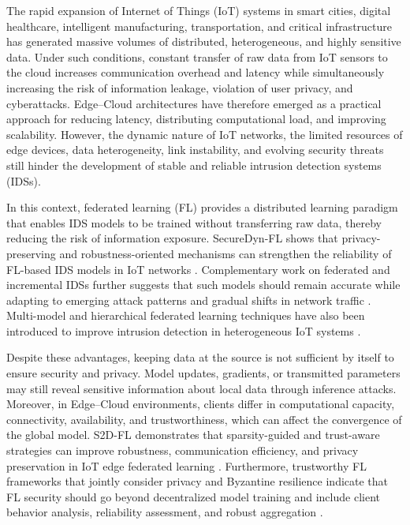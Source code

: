 \documentclass[5p,times,numafflabel]{elsarticle}
\begin{document}
	The rapid expansion of Internet of Things (IoT) systems in smart
	cities, digital healthcare, intelligent manufacturing, transportation,
	and critical infrastructure has generated massive volumes of
	distributed, heterogeneous, and highly sensitive data. Under such
	conditions, constant transfer of raw data from IoT sensors to the cloud
	increases communication overhead and latency while simultaneously
	increasing the risk of information leakage, violation of user privacy,
	and cyberattacks. Edge--Cloud architectures have therefore emerged as
	a practical approach for reducing latency, distributing computational
	load, and improving scalability. However, the dynamic nature of IoT
	networks, the limited resources of edge devices, data heterogeneity,
	link instability, and evolving security threats still hinder the
	development of stable and reliable intrusion detection systems (IDSs).
	
	In this context, federated learning (FL) provides a distributed
	learning paradigm that enables IDS models to be trained without
	transferring raw data, thereby reducing the risk of information
	exposure. SecureDyn-FL shows that privacy-preserving and
	robustness-oriented mechanisms can strengthen the reliability of
	FL-based IDS models in IoT networks
	\cite{soomro2026securedyn}. Complementary work on federated and
	incremental IDSs further suggests that such models should remain
	accurate while adapting to emerging attack patterns and gradual shifts
	in network traffic \cite{carillo2026incremental}. Multi-model and
	hierarchical federated learning techniques have also been introduced
	to improve intrusion detection in heterogeneous IoT systems
	\cite{latif2026multimodel}.
	
	Despite these advantages, keeping data at the source is not sufficient
	by itself to ensure security and privacy. Model updates, gradients, or
	transmitted parameters may still reveal sensitive information about
	local data through inference attacks. Moreover, in Edge--Cloud
	environments, clients differ in computational capacity, connectivity,
	availability, and trustworthiness, which can affect the convergence of
	the global model. S2D-FL demonstrates that sparsity-guided and
	trust-aware strategies can improve robustness, communication
	efficiency, and privacy preservation in IoT edge federated learning
	\cite{s2dfl2026}. Furthermore, trustworthy FL frameworks that jointly
	consider privacy and Byzantine resilience indicate that FL security
	should go beyond decentralized model training and include client
	behavior analysis, reliability assessment, and robust aggregation
	\cite{shu2026trustworthy}.
	
\end{document}
